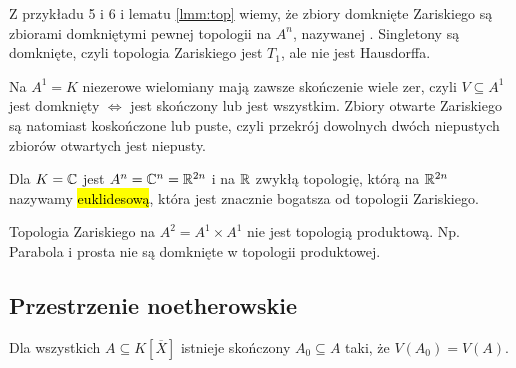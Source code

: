 \begin{conclusion}{}{}
  Z przykładu 5 i 6 i lematu \ref{lmm:top} wiemy, że zbiory domknięte Zariskiego są zbiorami domkniętymi pewnej topologii na $A^n$, nazywanej . Singletony są domknięte, czyli topologia Zariskiego jest $T_1$, ale nie jest Hausdorffa.
\end{conclusion}


\begin{example}
  Na $A^1=K$ niezerowe wielomiany mają zawsze skończenie wiele zer, czyli $V\subseteq A^1$ jest domknięty $\iff$ jest skończony lub jest wszystkim. Zbiory otwarte Zariskiego są natomiast koskończone lub puste, czyli przekrój dowolnych dwóch niepustych zbiorów otwartych jest niepusty.
\end{example}

\begin{remark}{}{}
  Dla $K=\mathbb{C}$ jest $A^n=\mathbb{C}^n=\mathbb{R}^{2n}$ i na $\mathbb{R}$ zwykłą topologię, którą na $\mathbb{R}^{2n}$ nazywamy \hl{euklidesową}, która jest znacznie bogatsza od topologii Zariskiego.

  \begin{center}
  \end{center}
\end{remark}

\begin{remark}{}{}
  Topologia Zariskiego na $A^2=A^1\times A^1$ nie jest topologią produktową. Np. Parabola i prosta nie są domknięte w topologii produktowej.
\end{remark}

\subsection{Przestrzenie noetherowskie}

\begin{proposition}{}{}
  Dla wszystkich $A\subseteq K[\overline{X}]$ istnieje skończony $A_0\subseteq A$ taki, że $V(A_0)=V(A)$.
\end{proposition}

